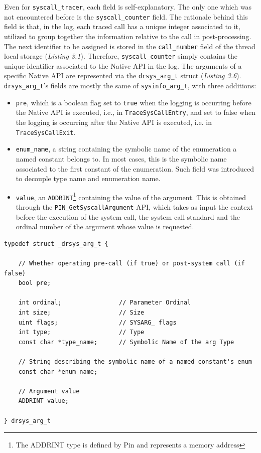 Even for \texttt{syscall\_tracer}, each field is self-explanatory. The only one which was not encountered before is the \texttt{syscall\_counter} field. The rationale behind this field is that, in the log, each traced call has a unique integer associated to it, utilized to group together the information relative to the call in post-processing. The next identifier to be assigned is stored in the \texttt{call\_number} field of the thread local storage (\textit{Listing 3.1}). Therefore, \texttt{syscall\_counter} simply contains the unique identifier associated to the Native API in the log. The arguments of a specific Native API are represented via the \texttt{drsys\_arg\_t} struct (\textit{Listing 3.6}).
\texttt{drsys\_arg\_t}'s fields are mostly the same of \texttt{sysinfo\_arg\_t}, with three additions:
\begin{itemize}
\item \texttt{pre}, which is a boolean flag set to \texttt{true} when the logging is occurring before the Native API is executed, i.e., in \texttt{TraceSysCallEntry}, and set to false when the logging is occurring after the Native API is executed, i.e. in \texttt{TraceSysCallExit}.
\item \texttt{enum\_name}, a string containing the symbolic name of the enumeration a named constant belongs to. In most cases, this is the symbolic name associated to the first constant of the enumeration. Such field was introduced to decouple type name and enumeration name.
\item \texttt{value}, an \texttt{ADDRINT}\footnote{The ADDRINT type is defined by Pin and represents a memory address} containing the value of the argument. This is obtained through the \texttt{PIN\_GetSyscallArgument} API, which takes as input the context before the execution of the system call, the system call standard and the ordinal number of the argument whose value is requested.  
\end{itemize}
\begin{lstlisting}[caption={\texttt{struct} representing an argument of the Native API being traced},captionpos=b]
typedef struct _drsys_arg_t {

	// Whether operating pre-call (if true) or post-system call (if false)
	bool pre;

	int ordinal;			    // Parameter Ordinal				
	int size;			        // Size	
	uint flags;			        // SYSARG_ flags
	int type;			        // Type
	const char *type_name;		// Symbolic Name of the arg Type

	// String describing the symbolic name of a named constant's enum
	const char *enum_name;

	// Argument value
	ADDRINT value;
	
} drsys_arg_t
\end{lstlisting}

